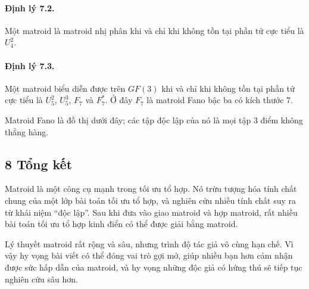 \documentclass[11pt]{article}
\begin{document}
\paragraph{Định lý 7.2.}
Một matroid là matroid nhị phân khi và chỉ khi không tồn tại phần tử cực tiểu là
\(U_4^2\).

\paragraph{Định lý 7.3.}
Một matroid biểu diễn được trên \(GF(3)\) khi và chỉ khi không tồn tại phần tử
cực tiểu là \(U_5^2\), \(U_5^3\), \(F_7\) và \(F_7^*\). Ở đây \(F_7\) là
matroid Fano bậc ba có kích thước 7.

Matroid Fano là đồ thị dưới đây; các tập độc lập của nó là mọi tập 3 điểm không
thẳng hàng.

\begin{center}
\end{center}

\subsection*{8 Tổng kết}

Matroid là một công cụ mạnh trong tối ưu tổ hợp. Nó trừu tượng hóa tính chất
chung của một lớp bài toán tối ưu tổ hợp, và nghiên cứu nhiều tính chất suy ra
từ khái niệm ``độc lập''. Sau khi đưa vào giao matroid và hợp matroid, rất
nhiều bài toán tối ưu tổ hợp kinh điển có thể được giải bằng matroid.

Lý thuyết matroid rất rộng và sâu, nhưng trình độ tác giả vô cùng hạn chế. Vì
vậy hy vọng bài viết có thể đóng vai trò gợi mở, giúp nhiều bạn hơn cảm nhận
được sức hấp dẫn của matroid, và hy vọng những độc giả có hứng thú sẽ tiếp tục
nghiên cứu sâu hơn.
\end{document}
